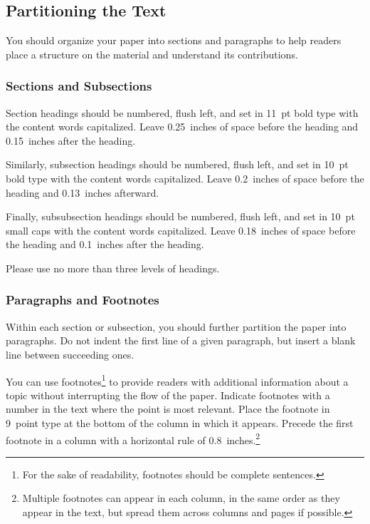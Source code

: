 \documentclass{article}
\begin{document}
\subsection{Partitioning the Text} 

You should organize your paper into sections and paragraphs to help
readers place a structure on the material and understand its
contributions.

\subsubsection{Sections and Subsections}

Section headings should be numbered, flush left, and set in 11~pt bold
type with the content words capitalized. Leave 0.25~inches of space
before the heading and 0.15~inches after the heading.

Similarly, subsection headings should be numbered, flush left, and set
in 10~pt bold type with the content words capitalized. Leave
0.2~inches of space before the heading and 0.13~inches afterward.

Finally, subsubsection headings should be numbered, flush left, and
set in 10~pt small caps with the content words capitalized. Leave
0.18~inches of space before the heading and 0.1~inches after the
heading. 

Please use no more than three levels of headings.

\subsubsection{Paragraphs and Footnotes}

Within each section or subsection, you should further partition the
paper into paragraphs. Do not indent the first line of a given
paragraph, but insert a blank line between succeeding ones.
 
You can use footnotes\footnote{For the sake of readability, footnotes
should be complete sentences.} to provide readers with additional
information about a topic without interrupting the flow of the paper. 
Indicate footnotes with a number in the text where the point is most
relevant. Place the footnote in 9~point type at the bottom of the
column in which it appears. Precede the first footnote in a column
with a horizontal rule of 0.8~inches.\footnote{Multiple footnotes can
appear in each column, in the same order as they appear in the text,
but spread them across columns and pages if possible.}
\end{document}
